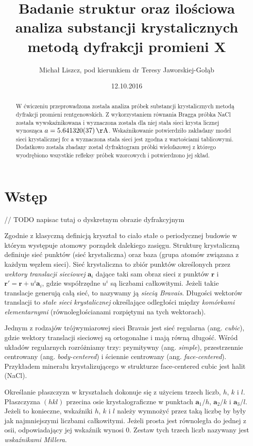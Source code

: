 \documentclass[polish,]{article}
\title{Badanie struktur oraz ilościowa analiza substancji krystalicznych\\
metodą dyfrakcji promieni X}
\author{Michał Liszcz, pod kierunkiem dr Teresy Jaworskiej-Gołąb}
\date{12.10.2016}
\begin{document}
\maketitle
\begin{abstract}
W ćwiczeniu przeprowadzona została analiza próbek substancji
krystalicznych metodą dyfrakcji promieni rentgenowskich. Z
wykorzystaniem równania Bragga próbka NaCl została wywskaźnikowana i
wyznaczona została dla niej stała sieci krysta licznej wynosząca
\(a = 5.641320(37)\,\mathrm{\AA}\). Wskaźnikowanie potwierdziło
zakładany model sieci krystalicznej fcc a wyznaczona stała sieci jest
zgodna z wartościami tablicowymi. Dodatkowo została zbadany został
dyfraktogram próbki wielofazowej z którego wyodrębiono wszystkie
refleksy próbek wzorcowych i potwierdzono jej skład.
\end{abstract}

\section{Wstęp}\label{wstux119p}

// TODO napisac tutaj o dyskretnym obrazie dyfrakcyjnym

Zgodnie z klasyczną definicją kryształ to ciało stałe o periodycznej
budowie w którym występuje atomowy porządek dalekiego zasięgu. Strukturę
krystaliczną definiuje sieć punktów (sieć krystaliczna) oraz baza (grupa
atomów związana z każdym węzłem sieci). Sieć krystaliczna to zbiór
punktów określonych przez \emph{wektory translacji sieciowej}
\(\bm{a}_i\) dające taki sam obraz sieci z punktów \(\bm{r}\) i
\(\bm{r}' = \bm{r} + u^i\bm{a}_i\), gdzie współrzędne \(u^i\) są
liczbami całkowitymi. Jeżeli takie translacje generują całą sieć, to
nazywamy ją \emph{siecią Bravais}. Długości wektorów translacji to
\emph{stałe sieci krystalicznej} określające odległości między
\emph{komórkami elementarnymi} (równoległościanami rozpiętymi na tych
wektorach).

Jednym z rodzajów trójwymiarowej sieci Bravais jest sieć regularna (ang.
\emph{cubic}), gdzie wektory translacji sieciowej są ortogonalne i mają
równą długość. Wśród układów regularnych rozróżniamy trzy: prymitywny
(ang. \emph{simple}), przestrzennie centrowany (ang.
\emph{body-centered}) i ściennie centrowany (ang. \emph{face-centered}).
Przykładem minerału krystalizującego w strukturze face-centered cubic
jest halit (NaCl).

Określanie płaszczyzn w kryształach dokonuje się z użyciem trzech liczb,
\(h\), \(k\) i \(l\). Płaszczyzna \((hkl)\) przecina osie
krystalograficzne w punktach \(\bm{a}_1/h\), \(\bm{a}_2/k\) i
\(\bm{a}_3/l\). Jeżeli to konieczne, wskaźniki \(h\), \(k\) i \(l\)
należy wymnożyć przez taką liczbę by były jak najmniejszymi liczbami
całkowitymi. Jeżeli prosta jest równoległa do jednej z osii,
odpowiadający jej wskaźnik wynosi \(0\). Zestaw tych trzech liczb
nazywany jest \emph{wskaźnikami Millera}.
\end{document}
